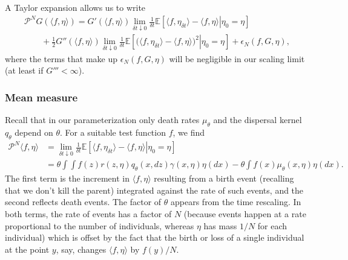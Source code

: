 \documentclass[EJP]{ejpecp} %
\newcommand{\IE}{\mathbb E}
\newcommand{\Pgen}{\mathcal{P}}    %
\begin{document}
A Taylor expansion allows us to write
\begin{multline}
	\label{generator prelimit}
    \Pgen^N
    G(\langle f,\eta \rangle)
    =
    G'(\langle f, \eta \rangle)
    \lim_{\delta t\downarrow 0} \frac{1}{\delta t}
    \IE\left[
        \left. \langle f, \eta_{\delta t} \rangle
        -
        \langle f, \eta \rangle
        \right| \eta_0=\eta
    \right]
    \\
    \qquad {}
    + \frac{1}{2}
        G''(\langle f,\eta\rangle)
    \lim_{\delta t\downarrow 0}\frac{1}{\delta t}
    \IE\left[
        \left.\big(\langle f,\eta_{\delta t}\rangle
        -
        \langle f, \eta\rangle\big)^2 \right|\eta_0=\eta
    \right]
    +
    \epsilon_N(f, G, \eta),
\end{multline}
where the terms that make up 
$\epsilon_N(f, G, \eta)$
will be negligible in our scaling limit (at least if $G'''<\infty$). 

\subsubsection*{Mean measure}

Recall that in our parameterization only death rates $\mu_\theta$
and the dispersal kernel $q_\theta$ depend on $\theta$.
For a suitable test function $f$, we find
\begin{equation} \label{mean measure}
    \begin{split}
    \Pgen^N \langle f, \eta \rangle
    &=
    \lim_{\delta t\downarrow 0} \frac{1}{\delta t}
    \IE\left[ \left.
        \langle f, \eta_{\delta t} \rangle
        -
        \langle f, \eta\rangle
        \right| \eta_0 = \eta
    \right]
    \\
    &=
    \theta \int
        \int f(z) r(z,\eta) q_\theta(x,dz)
    \gamma(x, \eta) \eta(dx)
    -
    \theta \int f(x)\mu_\theta(x, \eta)
    \eta(dx).
    \end{split}
\end{equation}
The first term is the increment in $\langle f,\eta\rangle$
resulting from a birth event (recalling that
we don't kill the parent) integrated against the rate of such events,
and the second reflects death events.
The factor of $\theta$ appears from the time rescaling.
In both terms,
the rate of events has a factor of $N$ (because events happen at a rate 
proportional to the number of individuals,
whereas $\eta$ has mass $1/N$ for each individual)
which is offset by the fact that  
the birth or loss of a single 
individual at the point $y$, say, changes $\langle f,\eta\rangle$
by $f(y)/N$.
\end{document}
